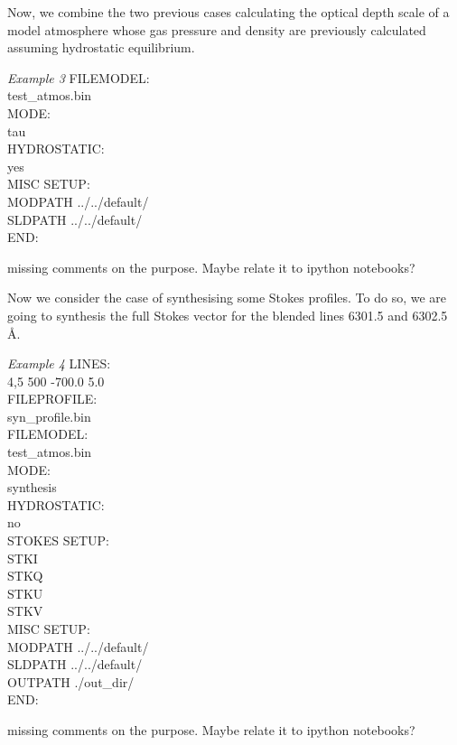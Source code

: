Now, we combine the two previous cases calculating the optical depth scale of a model atmosphere whose gas pressure and density are previously calculated assuming hydrostatic equilibrium.

\begin{ifbox}[label={tb:example03}]{{\it Example 3}}
  \scriptsize
FILEMODEL:\\
test\_atmos.bin\\
MODE:\\
tau\\
HYDROSTATIC:\\
yes\\
MISC SETUP:\\
MODPATH ../../default/\\
SLDPATH ../../default/\\
END:
  \normalsize
\end{ifbox}

{\Huge missing comments on the purpose. Maybe relate it to ipython notebooks?}

%

Now we consider the case of synthesising some Stokes profiles. To do so, we are going to synthesis the full Stokes vector for the blended lines 6301.5 and 6302.5 {\AA}.

\begin{ifbox}[label={tb:example04}]{{\it Example 4}}
  \scriptsize
LINES:\\
4,5 500 -700.0 5.0\\
FILEPROFILE:\\
syn\_profile.bin\\
FILEMODEL:\\
test\_atmos.bin\\
MODE:\\
synthesis\\
HYDROSTATIC:\\
no\\
STOKES SETUP:\\
STKI\\
STKQ\\
STKU\\
STKV\\
MISC SETUP:\\
MODPATH ../../default/\\
SLDPATH ../../default/\\
OUTPATH ./out\_dir/\\
END:
  \normalsize
\end{ifbox}

{\Huge missing comments on the purpose. Maybe relate it to ipython notebooks?}

